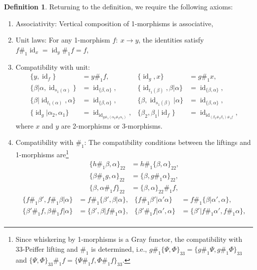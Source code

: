 \documentclass[11pt, reqno]{amsart} %
\newcommand{\id}{{\mathop{\mathrm{id}}}}
\theoremstyle{definition}
\newtheorem{definition}[theorem]{Definition}
\theoremstyle{remark}
\numberwithin{equation}{section}
\begin{document}
\begin{definition}
Returning to the definition, we require the following axioms:
\begin{enumerate}
  \setcounter{enumi}{\thetemp}
  \item Associativity: Vertical composition of 1-morphisms is associative, 
  \item Unit laws: For any 1-morphism $f:~x\to y$, the identities satisfy $f\#_1\id_x = \id_y\#_1f = f$, 
  \item \label{ax:Gray4-unit}Compatibility with unit:
    \begin{align}
      \{y,\id_f\} &= y\#_1f, &
      \{\id_g,x\} &= g\#_1x, \\
      \{\beta|\alpha,\id_{s_1(\alpha)}\} &= \id_{\{\beta,\alpha\}}, &
      \{\id_{t_1(\beta)},\beta|\alpha\} &= \id_{\{\beta,\alpha\}}, \\
      \{\beta|\id_{t_1(\alpha)},\alpha\} &= \id_{\{\beta,\alpha\}}, &
      \{\beta,\id_{s_1(\beta)}|\alpha\} &= \id_{\{\beta,\alpha\}}, \\
      \{\id_g|\alpha_2,\alpha_1\} &= \id_{\id_{g\#_1(\alpha_2\#_2\alpha_1)}}, &
      \{\beta_2,\beta_1|\id_f\} &= \id_{\id_{(\beta_2\#_2\beta_1)\#_1f}},
    \end{align}
  where $x$ and $y$ are 2-morphisms or 3-morphisms.
  \item \label{ax:Gray4-LiftingWhiskering}Compatibility with $\#_1$: The compatibility conditions between the liftings and 1-morphisms are\footnote{Since whiskering by 1-morphisms is a Gray functor, the compatibility with 33-Peiffer lifting and $\#_1$ is determined, i.e., $g\#_1\{\Psi,\Phi\}_{33} = \{g\#_1\Psi,g\#_1\Phi\}_{33}$ and $\{\Psi,\Phi\}_{33}\#_1f = \{\Psi\#_1f,\Phi\#_1f\}_{33}$.}
  \begin{align}
    \nonumber
    \{h\#_1\beta,\alpha\}_{22} &= h\#_1\{\beta,\alpha\}_{22}, \\
    \nonumber
    \{\beta\#_1g,\alpha\}_{22} &= \{\beta,g\#_1\alpha\}_{22}, \\
    \nonumber
    \{\beta,\alpha\#_1f\}_{22} &= \{\beta,\alpha\}_{22}\#_1f,
  \end{align}
  \begin{align}
    \nonumber
    \{f\#_1\beta',f\#_1\beta|\alpha\} &= f\#_1\{\beta',\beta|\alpha\}, &
    \{f\#_1\beta'|\alpha'\alpha\} &= f\#_1\{\beta|\alpha',\alpha\}, \\
    \nonumber
    \{\beta'\#_1f,\beta\#_1f|\alpha\} &= \{\beta',\beta|f\#_1\alpha\}, &
    \{\beta'\#_1f|\alpha',\alpha\} &= \{\beta'|f\#_1\alpha',f\#_1\alpha\}, \\

\end{align}
\end{enumerate}
\end{definition}
\end{document}
